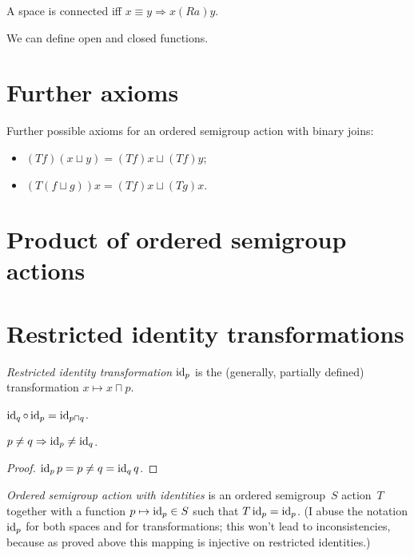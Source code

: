 A space is connected iff $x\equiv y\Rightarrow x(Ra)y$.


We can define open and closed functions.

\chapter{Further axioms}

Further possible axioms for an ordered semigroup action with binary joins:

\begin{itemize}
\item $(Tf)(x\sqcup y)=(Tf)x\sqcup(Tf)y$;
\item $(T(f\sqcup g))x=(Tf)x\sqcup(Tg)x$.
\end{itemize}


\chapter{Product of ordered semigroup actions}


\chapter{Restricted identity transformations}

\emph{Restricted identity transformation} $\operatorname{id}_p$ is the (generally, partially defined) transformation $x\mapsto x\sqcap p$.

\begin{obvious}
$\operatorname{id}_q\circ\operatorname{id}_p = \operatorname{id}_{p\sqcap q}$.
\end{obvious}

\begin{prop}
$p\ne q\Rightarrow\operatorname{id}_p\ne\operatorname{id}_q$.
\end{prop}

\begin{proof}
$\operatorname{id}_p p=p \ne q = \operatorname{id}_q q$.
\end{proof}

\emph{Ordered semigroup action with identities} is an ordered semigroup~$S$ action~$T$ together with a function $p\mapsto\operatorname{id}_p\in S$ such that $T\operatorname{id}_p=\operatorname{id}_p$. (I abuse the notation $\operatorname{id}_p$ for both spaces and for transformations; this won't lead to inconsistencies, because as proved above this mapping is injective on restricted identities.)

